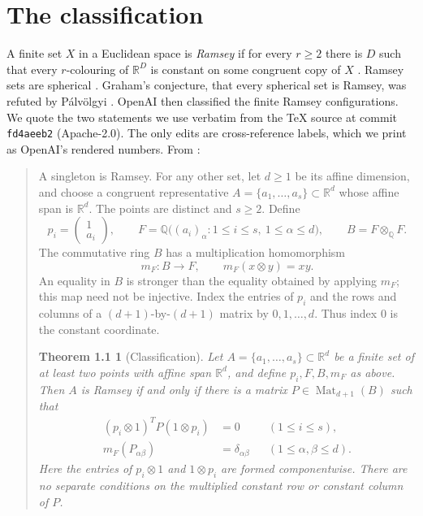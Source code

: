 \documentclass[11pt]{amsart}
\newcommand{\Q}{\mathbb{Q}}
\newcommand{\R}{\mathbb{R}}
\theoremstyle{plain}
\newtheorem*{oaithm}{Theorem 1.1}
\theoremstyle{definition}
\begin{document}
\section{The classification}\label{sec:oai}

A finite set $X$ in a Euclidean space is \emph{Ramsey} if for every $r\ge2$ there is $D$ such that
every $r$-colouring of $\R^D$ is constant on some congruent copy of $X$
\cite{EGMRSS,OAI172}. Ramsey sets are spherical \cite{EGMRSS}. Graham's conjecture, that every
spherical set is Ramsey, was refuted by P\'alv\"olgyi \cite{Palvolgyi}. OpenAI \cite{OAI172}
then classified the finite Ramsey configurations. We quote the two statements we use verbatim
from the \TeX{} source at commit \texttt{fd4aeeb2} (Apache-2.0). The only edits are cross-reference
labels, which we print as OpenAI's rendered numbers. From \cite[\S1.1]{OAI172}:

{\small
\begin{quote}
A singleton is Ramsey. For any other set, let $d\ge1$ be its affine
dimension, and choose a congruent representative
$A=\{a_1,\ldots,a_s\}\subset\R^d$ whose affine span is $\R^d$.
The points are distinct and $s\ge2$. Define
\[
 p_i=\begin{pmatrix}1\\a_i\end{pmatrix},\qquad
 F=\Q\bigl((a_i)_\alpha:1\le i\le s,\ 1\le\alpha\le d\bigr),
 \qquad B=F\otimes_{\Q}F.
\]
The commutative ring $B$ has a multiplication homomorphism
\[
 m_F:B\longrightarrow F,\qquad m_F(x\otimes y)=xy.
\]
An equality in $B$ is stronger than the equality obtained by applying
$m_F$; this map need not be injective. Index the entries of $p_i$ and
the rows and columns of a $(d+1)$-by-$(d+1)$ matrix by $0,1,\ldots,d$.
Thus index $0$ is the constant coordinate.

\begin{oaithm}[Classification]
Let $A=\{a_1,\ldots,a_s\}\subset\R^d$ be a finite set of at least two
points with affine span $\R^d$, and define $p_i,F,B,m_F$ as above.
Then $A$ is Ramsey if and only if there is a matrix
$P\in\operatorname{Mat}_{d+1}(B)$ such that
\begin{align}
 (p_i\otimes1)^T P(1\otimes p_i)&=0
       &&(1\le i\le s),\tag{1}\\
 m_F(P_{\alpha\beta})&=\delta_{\alpha\beta}
       &&(1\le\alpha,\beta\le d).\tag{2}
\end{align}
Here the entries of $p_i\otimes1$ and $1\otimes p_i$ are formed
componentwise. There are no separate conditions on the multiplied
constant row or constant column of $P$.
\end{oaithm}
\end{quote}
}
\end{document}
